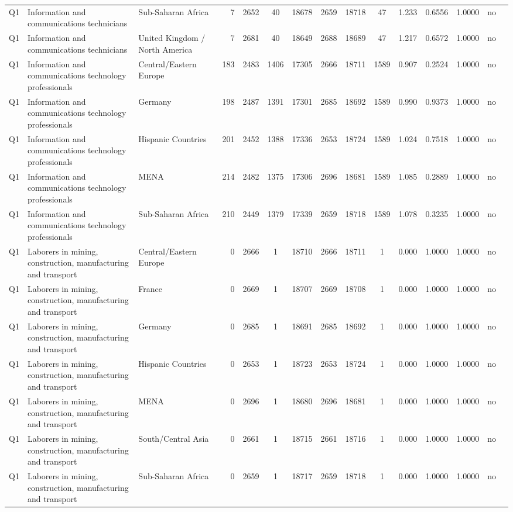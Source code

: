 \begin{longtable}{lllrcccccccccll}
Q1 & Information and communications technicians & Sub-Saharan Africa & 7 & 2652 & 40 & 18678 & 2659 & 18718 & 47 & 1.233 & 0.6556 & 1.0000 & no \\
Q1 & Information and communications technicians & United Kingdom / North America & 7 & 2681 & 40 & 18649 & 2688 & 18689 & 47 & 1.217 & 0.6572 & 1.0000 & no \\
Q1 & Information and communications technology professionals & Central/Eastern Europe & 183 & 2483 & 1406 & 17305 & 2666 & 18711 & 1589 & 0.907 & 0.2524 & 1.0000 & no \\
Q1 & Information and communications technology professionals & Germany & 198 & 2487 & 1391 & 17301 & 2685 & 18692 & 1589 & 0.990 & 0.9373 & 1.0000 & no \\
Q1 & Information and communications technology professionals & Hispanic Countries & 201 & 2452 & 1388 & 17336 & 2653 & 18724 & 1589 & 1.024 & 0.7518 & 1.0000 & no \\
Q1 & Information and communications technology professionals & MENA & 214 & 2482 & 1375 & 17306 & 2696 & 18681 & 1589 & 1.085 & 0.2889 & 1.0000 & no \\
Q1 & Information and communications technology professionals & Sub-Saharan Africa & 210 & 2449 & 1379 & 17339 & 2659 & 18718 & 1589 & 1.078 & 0.3235 & 1.0000 & no \\
Q1 & Laborers in mining, construction, manufacturing and transport & Central/Eastern Europe & 0 & 2666 & 1 & 18710 & 2666 & 18711 & 1 & 0.000 & 1.0000 & 1.0000 & no \\
Q1 & Laborers in mining, construction, manufacturing and transport & France & 0 & 2669 & 1 & 18707 & 2669 & 18708 & 1 & 0.000 & 1.0000 & 1.0000 & no \\
Q1 & Laborers in mining, construction, manufacturing and transport & Germany & 0 & 2685 & 1 & 18691 & 2685 & 18692 & 1 & 0.000 & 1.0000 & 1.0000 & no \\
Q1 & Laborers in mining, construction, manufacturing and transport & Hispanic Countries & 0 & 2653 & 1 & 18723 & 2653 & 18724 & 1 & 0.000 & 1.0000 & 1.0000 & no \\
Q1 & Laborers in mining, construction, manufacturing and transport & MENA & 0 & 2696 & 1 & 18680 & 2696 & 18681 & 1 & 0.000 & 1.0000 & 1.0000 & no \\
Q1 & Laborers in mining, construction, manufacturing and transport & South/Central Asia & 0 & 2661 & 1 & 18715 & 2661 & 18716 & 1 & 0.000 & 1.0000 & 1.0000 & no \\
Q1 & Laborers in mining, construction, manufacturing and transport & Sub-Saharan Africa & 0 & 2659 & 1 & 18717 & 2659 & 18718 & 1 & 0.000 & 1.0000 & 1.0000 & no \\

\end{longtable}
